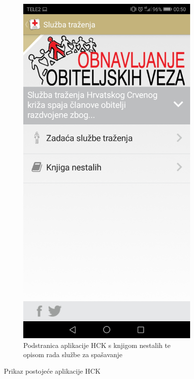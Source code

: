 {\begin{figure}[h!]
\begin{subfigure}[b]{0.3\linewidth}
					\centering
					\includegraphics[scale=0.1]{./slike/crv3.jpg}
					\caption{\tiny Podstranica aplikacije HCK s knjigom nestalih te opisom rada službe za spašavanje}
					\label{fig:sub-third}
				\end{subfigure}
			\caption{Prikaz postojeće aplikacije HCK}
			\label{fig:fig}
			\end{figure}\\
			
}

